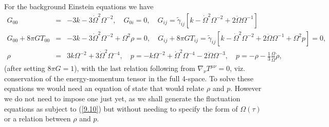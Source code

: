 \documentclass[aps,onecolumn,10pt]{revtex4}
\numberwithin{equation}{section}
\numberwithin{equation}{section}
\begin{document}
For the background Einstein equations we have
%
\begin{eqnarray}
G_{00}&=& -3k - 3 \dot{\Omega}^2\Omega^{-2},\quad G_{0i} =0,
\quad G_{ij} = \tilde{\gamma}_{ij}\left[k - \dot\Omega^2\Omega^{-2}+ 2\ddot\Omega \Omega^{-1}\right]
 \nonumber\\
G_{00}+8\pi G T_{00} &=& -3k - 3 \dot\Omega^2\Omega^{-2} + \Omega^2 \rho=0,\quad
G_{ij}+8\pi G T_{ij}= \tilde{\gamma}_{ij}\left[k - \dot\Omega^2\Omega^{-2} + 2\ddot\Omega \Omega^{-1}  + \Omega^2 p\right]=0,
\nonumber\\
\rho &=& 3k\Omega^{-2}+3\dot\Omega^2 \Omega^{-4},\quad p = -k\Omega^{-2} + \dot\Omega^2\Omega^{-4} -2\ddot\Omega \Omega^{-3},\quad p = -\rho -\frac{1}{3} \frac{\Omega}{\dot\Omega}\dot\rho,
\label{9.10}
\end{eqnarray}
%
(after setting $8\pi G=1$), with the last relation following from $\nabla_{\nu}T^{\mu\nu}=0$, viz. conservation of the energy-momentum tensor in the full 4-space. To solve these equations we would need an equation of state that would relate $\rho$ and $p$. However we do not need to impose one just yet, as we shall generate the fluctuation equations as subject to (\ref{9.10}) but without needing to specify the form of $\Omega(\tau)$ or a relation  between $\rho$ and $p$.
\end{document}
